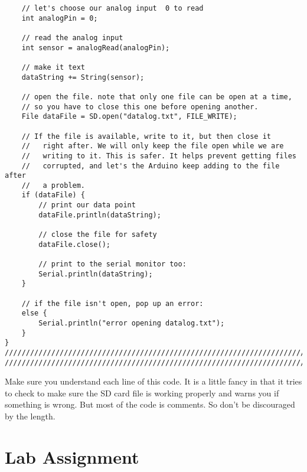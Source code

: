 \begin{verbatim}
    // let's choose our analog input  0 to read
    int analogPin = 0;
 
    // read the analog input
    int sensor = analogRead(analogPin);
 
    // make it text
    dataString += String(sensor);
  
    // open the file. note that only one file can be open at a time,
    // so you have to close this one before opening another.
    File dataFile = SD.open("datalog.txt", FILE_WRITE);
 
    // If the file is available, write to it, but then close it 
    //   right after. We will only keep the file open while we are 
    //   writing to it. This is safer. It helps prevent getting files 
    //   corrupted, and let's the Arduino keep adding to the file after 
    //   a problem.
    if (dataFile) {
        // print our data point
        dataFile.println(dataString);
 
        // close the file for safety
        dataFile.close();
 
        // print to the serial monitor too:
        Serial.println(dataString);
    }
 
    // if the file isn't open, pop up an error:
    else {
        Serial.println("error opening datalog.txt");
    }
}
////////////////////////////////////////////////////////////////////////////
////////////////////////////////////////////////////////////////////////////
\end{verbatim}

Make sure you understand each line of this code. It is a little fancy in
that it tries to check to make sure the SD card file is working properly and
warns you if something is wrong. But most of the code is comments. So don't
be discouraged by the length.

\section{Lab Assignment}

